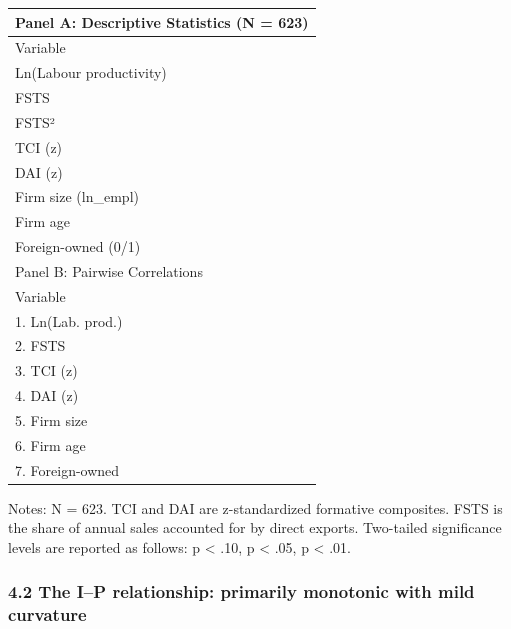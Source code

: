 \documentclass[12pt,a4paper]{article}
\begin{document}
\begin{longtable}[]{@{}l@{}}
\toprule\noalign{}
Panel A: Descriptive Statistics (N = 623) \\
\midrule\noalign{}
\endhead
\bottomrule\noalign{}
\endlastfoot
Variable \\
Ln(Labour productivity) \\
FSTS \\
FSTS² \\
TCI (z) \\
DAI (z) \\
Firm size (ln\_empl) \\
Firm age \\
Foreign-owned (0/1) \\
Panel B: Pairwise Correlations \\
Variable \\
1. Ln(Lab. prod.) \\
2. FSTS \\
3. TCI (z) \\
4. DAI (z) \\
5. Firm size \\
6. Firm age \\
7. Foreign-owned \\
\end{longtable}

Notes: N = 623. TCI and DAI are z-standardized formative composites.
FSTS is the share of annual sales accounted for by direct exports.
Two-tailed significance levels are reported as follows: p \textless{}
.10, p \textless{} .05, p \textless{} .01.

\hypertarget{42-the-ip-relationship-primarily-monotonic-with-mild-curvature}{%
\subsubsection{4.2 The I--P relationship: primarily monotonic with mild
curvature}\label{42-the-ip-relationship-primarily-monotonic-with-mild-curvature}}
\end{document}

